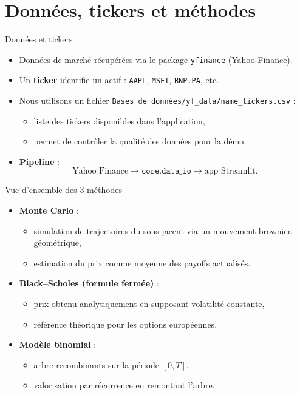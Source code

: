 \documentclass[aspectratio=169]{beamer}
\begin{document}
\section{Donn\'ees, tickers et m\'ethodes}

\begin{frame}{Donn\'ees et tickers}
  \begin{itemize}
    \item Donn\'ees de march\'e r\'ecup\'er\'ees via le package \texttt{yfinance} (Yahoo Finance).
    \item Un \textbf{ticker} identifie un actif : \texttt{AAPL}, \texttt{MSFT}, \texttt{BNP.PA}, etc.
    \item Nous utilisons un fichier
      \texttt{Bases de donn\'ees/yf\_data/name\_tickers.csv} :
      \begin{itemize}
        \item liste des tickers disponibles dans l'application,
        \item permet de contr\^oler la qualit\'e des donn\'ees pour la d\'emo.
      \end{itemize}
    \item \textbf{Pipeline} :
      \[
      \text{Yahoo Finance} \rightarrow \texttt{core.data\_io}
      \rightarrow \text{app Streamlit}.
      \]
  \end{itemize}
\end{frame}

\begin{frame}{Vue d'ensemble des 3 m\'ethodes}
  \begin{itemize}
    \item \textbf{Monte Carlo} :
      \begin{itemize}
        \item simulation de trajectoires du sous-jacent via un mouvement brownien g\'eom\'etrique,
        \item estimation du prix comme moyenne des payoffs actualis\'es.
      \end{itemize}
    \item \textbf{Black--Scholes (formule ferm\'ee)} :
      \begin{itemize}
        \item prix obtenu analytiquement en supposant volatilité constante,
        \item r\'ef\'erence th\'eorique pour les options europ\'eennes.
      \end{itemize}
    \item \textbf{Mod\`ele binomial} :
      \begin{itemize}
        \item arbre recombinants sur la p\'eriode $[0,T]$,
        \item valorisation par r\'ecurrence en remontant l'arbre.
      \end{itemize}
  \end{itemize}
\end{frame}
\end{document}

